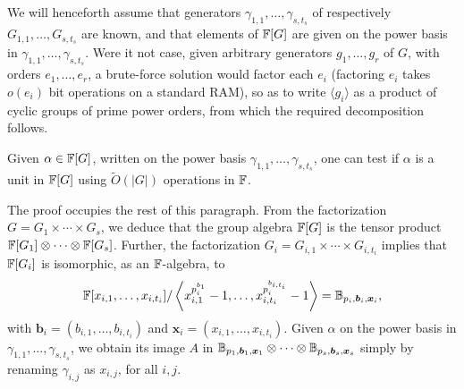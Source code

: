 We will henceforth assume that generators
$\gamma_{1,1},\dots,\gamma_{s,t_s}$ of respectively
$G_{1,1},\dots,G_{s,t_s}$ are known, and that elements of $\mathbb{F}[G]$ are
given on the power basis in $\gamma_{1,1},\dots,\gamma_{s,t_s}$. Were
it not case, given arbitrary generators $g_1,\dots,g_r$ of $G$, with
orders $e_1,\dots,e_r$, a brute-force solution would factor each $e_i$
(factoring $e_i$ takes $o(e_i)$ bit operations on a standard RAM), so
as to write $\langle g_i \rangle$ as a product of cyclic groups of
prime power orders, from which the required decomposition follows.

\begin{proposition}
  Given $\alpha \in \mathbb{F}[G]$, written on the power basis
  $\gamma_{1,1},\dots,\gamma_{s,t_s}$, one can test if $\alpha$ is a
  unit in $\mathbb{F}[G]$ using $\tilde{O}(|G|)$ operations in $\mathbb{F}$.
\end{proposition}
The proof occupies the rest of this paragraph.
From the factorization $G = G_1 \times \cdots \times G_s$, we deduce
that the group algebra $\mathbb{F}[G]$ is the tensor product $\mathbb{F}[G_1]
\otimes \cdots \otimes \mathbb{F}[G_s]$. Further, the 
factorization $G_i = G_{i,1} \times \cdots \times G_{i,t_i}$
implies that $\mathbb{F}[G_i]$ is isomorphic, as an $\mathbb{F}$-algebra, to
$$\mathbb{F}[x_{i,1},\dots,x_{i,t_i}]/\left \langle
x_{i,1}^{p_i^{b_{1}}}-1,\dots,x_{i,t_i}^{p_i^{b_{i,t_i}}}-1\right\rangle
=\mathbb{B}_{p_i,\boldsymbol{b}_i,\boldsymbol{x}_i},$$ with $\boldsymbol{b}_i =
(b_{i,1},\dots,b_{i,t_i})$ and $\boldsymbol{x}_i =
(x_{i,1},\dots,x_{i,t_i})$. Given $\alpha$ on the
power basis in $\gamma_{1,1},\dots,\gamma_{s,t_s}$, we obtain
its image 
$A$ in 
$\mathbb{B}_{p_1,\boldsymbol{b}_1,\boldsymbol{x}_1} \otimes \cdots \otimes 
\mathbb{B}_{p_s,\boldsymbol{b}_s,\boldsymbol{x}_s}$ simply 
by renaming $\gamma_{i,j}$ as $x_{i,j}$, for all $i,j$.

